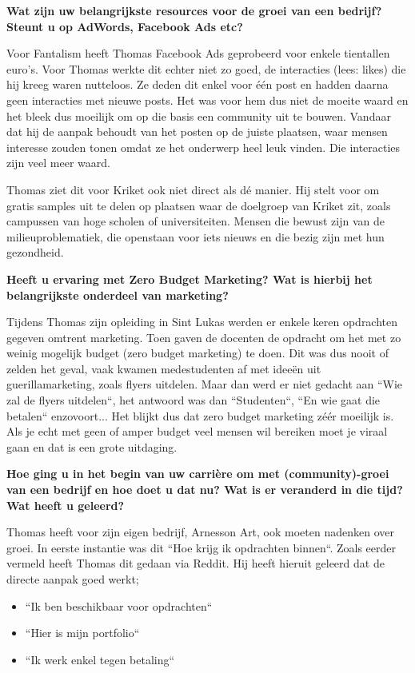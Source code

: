 \textbf{Wat zijn uw belangrijkste resources voor de groei van een bedrijf? Steunt u op AdWords, Facebook Ads etc?}
	
Voor Fantalism heeft Thomas Facebook Ads geprobeerd voor enkele tientallen euro's. Voor Thomas werkte dit echter niet zo goed, de interacties (lees: likes) die hij kreeg waren nutteloos. Ze deden dit enkel voor één post en hadden daarna geen interacties met nieuwe posts. Het was voor hem dus niet de moeite waard en het bleek dus moeilijk om op die basis een community uit te bouwen. Vandaar dat hij de aanpak behoudt van het posten op de juiste plaatsen, waar mensen interesse zouden tonen omdat ze het onderwerp heel leuk vinden. Die interacties zijn veel meer waard.

Thomas ziet dit voor Kriket ook niet direct als dé manier. Hij stelt voor om gratis samples uit te delen op plaatsen waar de doelgroep van Kriket zit, zoals campussen van hoge scholen of universiteiten. Mensen die bewust zijn van de milieuproblematiek, die openstaan voor iets nieuws en die bezig zijn met hun gezondheid.
	
\textbf{Heeft u ervaring met Zero Budget Marketing? Wat is hierbij het belangrijkste onderdeel van marketing?}
	
Tijdens Thomas zijn opleiding in Sint Lukas werden er enkele keren opdrachten gegeven omtrent marketing. Toen gaven de docenten de opdracht om het met zo weinig mogelijk budget (zero budget marketing) te doen. Dit was dus nooit of zelden het geval, vaak kwamen medestudenten af met ideeën uit guerillamarketing, zoals flyers uitdelen. Maar dan werd er niet gedacht aan ``Wie zal de flyers uitdelen``, het antwoord was dan ``Studenten``, ``En wie gaat die betalen`` enzovoort... Het blijkt dus dat zero budget marketing zéér moeilijk is. Als je echt met geen of amper budget veel mensen wil bereiken moet je viraal gaan en dat is een grote uitdaging.
	
\textbf{Hoe ging u in het begin van uw carrière om met (community)-groei van een bedrijf en hoe doet u dat nu? Wat is er veranderd in die tijd? Wat heeft u geleerd?}
	
Thomas heeft voor zijn eigen bedrijf, Arnesson Art, ook moeten nadenken over groei. In eerste instantie was dit ``Hoe krijg ik opdrachten binnen``. Zoals eerder vermeld heeft Thomas dit gedaan via Reddit. Hij heeft hieruit geleerd dat de directe aanpak goed werkt;

\begin{itemize} 
	\item ``Ik ben beschikbaar voor opdrachten``
	\item ``Hier is mijn portfolio``
	\item ``Ik werk enkel tegen betaling``
\end{itemize} 

